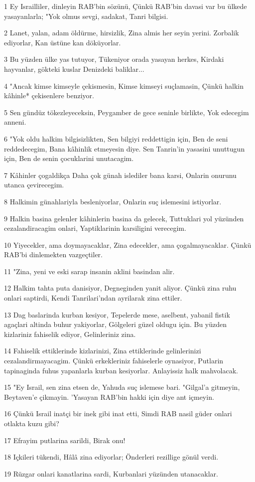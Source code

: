 \par 1 Ey Israilliler, dinleyin RAB'bin sözünü, Çünkü RAB'bin davasi var bu ülkede yasayanlarla; "Yok olmus sevgi, sadakat, Tanri bilgisi.
\par 2 Lanet, yalan, adam öldürme, hirsizlik, Zina almis her seyin yerini. Zorbalik ediyorlar, Kan üstüne kan döküyorlar.
\par 3 Bu yüzden ülke yas tutuyor, Tükeniyor orada yasayan herkes, Kirdaki hayvanlar, gökteki kuslar Denizdeki baliklar...
\par 4 "Ancak kimse kimseyle çekismesin, Kimse kimseyi suçlamasin, Çünkü halkin kâhinle* çekisenlere benziyor.
\par 5 Sen gündüz tökezleyeceksin, Peygamber de gece seninle birlikte, Yok edecegim anneni.
\par 6 "Yok oldu halkim bilgisizlikten, Sen bilgiyi reddettigin için, Ben de seni reddedecegim, Bana kâhinlik etmeyesin diye. Sen Tanrin'in yasasini unuttugun için, Ben de senin çocuklarini unutacagim.
\par 7 Kâhinler çogaldikça Daha çok günah islediler bana karsi, Onlarin onurunu utanca çevirecegim.
\par 8 Halkimin günahlariyla besleniyorlar, Onlarin suç islemesini istiyorlar.
\par 9 Halkin basina gelenler kâhinlerin basina da gelecek, Tuttuklari yol yüzünden cezalandiracagim onlari, Yaptiklarinin karsiligini verecegim.
\par 10 Yiyecekler, ama doymayacaklar, Zina edecekler, ama çogalmayacaklar. Çünkü RAB'bi dinlemekten vazgeçtiler.
\par 11 "Zina, yeni ve eski sarap insanin aklini basindan alir.
\par 12 Halkim tahta puta danisiyor, Degneginden yanit aliyor. Çünkü zina ruhu onlari saptirdi, Kendi Tanrilari'ndan ayrilarak zina ettiler.
\par 13 Dag baslarinda kurban kesiyor, Tepelerde mese, aselbent, yabanil fistik agaçlari altinda buhur yakiyorlar, Gölgeleri güzel oldugu için. Bu yüzden kizlariniz fahiselik ediyor, Gelinleriniz zina.
\par 14 Fahiselik ettiklerinde kizlarinizi, Zina ettiklerinde gelinlerinizi cezalandirmayacagim. Çünkü erkekleriniz fahiselerle oynasiyor, Putlarin tapinaginda fuhus yapanlarla kurban kesiyorlar. Anlayissiz halk mahvolacak.
\par 15 "Ey Israil, sen zina etsen de, Yahuda suç islemese bari. "Gilgal'a gitmeyin, Beytaven'e çikmayin. 'Yasayan RAB'bin hakki için diye ant içmeyin.
\par 16 Çünkü Israil inatçi bir inek gibi inat etti, Simdi RAB nasil güder onlari otlakta kuzu gibi?
\par 17 Efrayim putlarina sarildi, Birak onu!
\par 18 Içkileri tükendi, Hâlâ zina ediyorlar; Önderleri rezillige gönül verdi.
\par 19 Rüzgar onlari kanatlarina sardi, Kurbanlari yüzünden utanacaklar.

